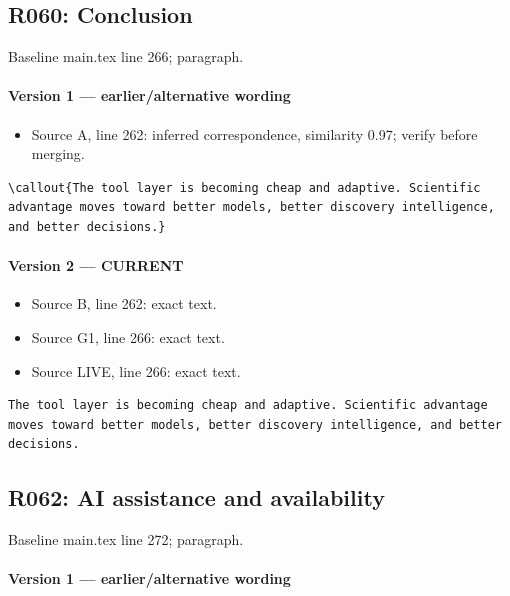 \documentclass[11pt]{article}
\newcommand{\callout}[1]{%
  \begin{center}
  \fcolorbox{molteal}{callout}{\parbox{0.90\linewidth}{\centering\bfseries #1}}
  \end{center}
}
\begin{document}
\subsection{R060: Conclusion}

Baseline main.tex line 266; paragraph.

\paragraph{Version 1 --- earlier/alternative wording}

\begin{itemize}[leftmargin=*]
\item Source A, line 262: inferred correspondence, similarity 0.97; verify before merging.
\end{itemize}

\begin{lstlisting}
\callout{The tool layer is becoming cheap and adaptive. Scientific advantage moves toward better models, better discovery intelligence, and better decisions.}
\end{lstlisting}

\paragraph{Version 2 --- CURRENT}

\begin{itemize}[leftmargin=*]
\item Source B, line 262: exact text.
\item Source G1, line 266: exact text.
\item Source LIVE, line 266: exact text.
\end{itemize}

\begin{lstlisting}
The tool layer is becoming cheap and adaptive. Scientific advantage moves toward better models, better discovery intelligence, and better decisions.
\end{lstlisting}

\subsection{R062: AI assistance and availability}

Baseline main.tex line 272; paragraph.

\paragraph{Version 1 --- earlier/alternative wording}
\end{document}

